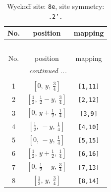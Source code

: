 \documentclass[fleqn,8pt]{jsarticle}
\begin{document}
\renewcommand{\arraystretch}{1.2}
\begin{longtable}{ccc}
\caption{Wyckoff site: {\tt 8e}, site symmetry: {\tt .2'.}}
 \\
 \hline \hline
No. & position & mapping \\ \hline \endfirsthead

\multicolumn{2}{l}{\tablename\ \thetable{}} \\
 \hline \hline
No. & position & mapping \\ \hline \endhead

 \hline \hline
\multicolumn{2}{r}{\footnotesize\it continued ...} \\ \endfoot

 \hline \hline
\multicolumn{2}{r}{} \\ \endlastfoot

1 & $\left[ 0,\, y,\, \frac{3}{4} \right]$ & {\tt [1,11]} \\ \hline
2 & $\left[ \frac{1}{2},\, \frac{1}{2} - y,\, \frac{3}{4} \right]$ & {\tt [2,12]} \\ \hline
3 & $\left[ 0,\, y + \frac{1}{2},\, \frac{1}{4} \right]$ & {\tt [3,9]} \\ \hline
4 & $\left[ \frac{1}{2},\, - y,\, \frac{1}{4} \right]$ & {\tt [4,10]} \\ \hline
5 & $\left[ 0,\, - y,\, \frac{1}{4} \right]$ & {\tt [5,15]} \\ \hline
6 & $\left[ \frac{1}{2},\, y + \frac{1}{2},\, \frac{1}{4} \right]$ & {\tt [6,16]} \\ \hline
7 & $\left[ 0,\, \frac{1}{2} - y,\, \frac{3}{4} \right]$ & {\tt [7,13]} \\ \hline
8 & $\left[ \frac{1}{2},\, y,\, \frac{3}{4} \right]$ & {\tt [8,14]} \\
\end{longtable}
\renewcommand{\arraystretch}{1.2}
\end{document}
